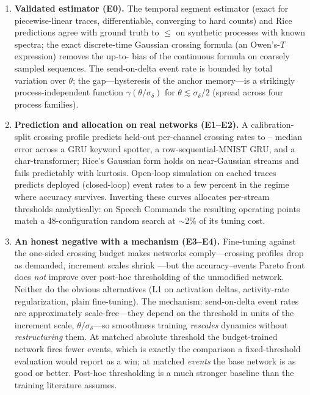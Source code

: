 \documentclass[10pt]{article}
\begin{document}
\begin{enumerate}
\item \textbf{Validated estimator (E0).} The temporal segment estimator
(exact for piecewise-linear traces, differentiable, converging to hard
counts) and Rice predictions agree with ground truth to
$\le$\GateVRiceGP{} on synthetic processes with known spectra; the exact
discrete-time Gaussian crossing formula (an Owen's-$T$ expression) removes
the up-to-\OURiceFDWorst{} bias of the continuous formula on coarsely
sampled sequences. The send-on-delta event rate is bounded by total
variation over $\theta$; the gap---hysteresis of the anchor memory---is a
strikingly process-independent function $\gamma(\theta/\sigma_\delta)$ for
$\theta\lesssim\sigma_\delta/2$ (spread \GammaSpreadSmallX{} across four
process families).
\item \textbf{Prediction and allocation on real networks (E1--E2).} A
calibration-split crossing profile predicts held-out per-channel crossing
rates to \EmpMedianSCTwo--\EmpMedianEnwik{} median error across a GRU
keyword spotter, a row-sequential-MNIST GRU, and a char-transformer; Rice's
Gaussian form holds on near-Gaussian streams and fails predictably with
kurtosis. Open-loop simulation on cached traces predicts deployed
(closed-loop) event rates to a few percent in the regime where accuracy
survives. Inverting these curves allocates per-stream thresholds
analytically: on Speech Commands the resulting operating points match a
48-configuration random search at $\sim$2\% of its tuning cost.
\item \textbf{An honest negative with a mechanism (E3--E4).} Fine-tuning
against the one-sided crossing budget makes networks comply---crossing
profiles drop as demanded, increment scales shrink
\SigmaShrinkPsMNIST{}---but the accuracy--events Pareto front does
\emph{not} improve over post-hoc thresholding of the unmodified network.
Neither do the obvious alternatives (L1 on activation deltas, activity-rate
regularization, plain fine-tuning). The mechanism: send-on-delta event
rates are approximately scale-free---they depend on the threshold in units
of the increment scale, $\theta/\sigma_\delta$---so smoothness training
\emph{rescales} dynamics without \emph{restructuring} them. At matched
absolute threshold the budget-trained network fires
\AbsThetaSavingPsMNIST{} fewer events, which is exactly the comparison a
fixed-threshold evaluation would report as a win; at matched \emph{events}
the base network is as good or better. Post-hoc thresholding is a much
stronger baseline than the training literature assumes.
\end{enumerate}
\end{document}
